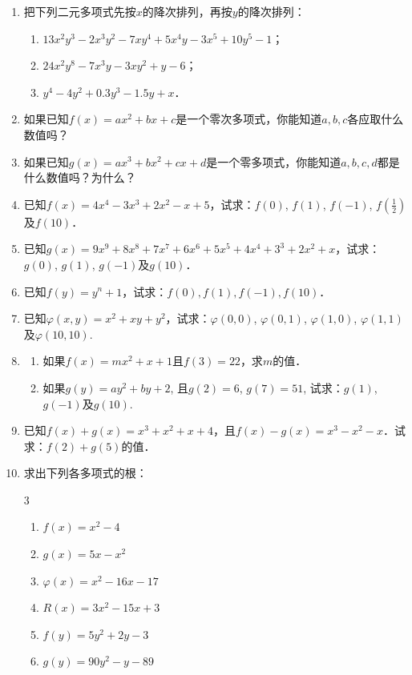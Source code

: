 \begin{enumerate}
\item 把下列二元多项式先按$x$的降次排列，再按$y$的降次排列：
\begin{enumerate}
    \item $13x^2y^3-2x^3y^2-7xy^4+5x^4y-3x^5+10y^5-1$；
    \item $24x^2y^8-7x^3y-3xy^2+y-6$；
    \item $y^4-4y^2+0.3y^3-1.5y+x$．
\end{enumerate}


\item 如果已知$f(x)=ax^2+bx+c$是一个零次多项式，你能知道$a,b,c$各应取什么数值吗？
\item 如果已知$g(x)=ax^3+bx^2+cx+d$是一个零多项式，你能知道$a,b,c,d$都是什么数值吗？为什么？
\item 已知$f(x)=4x^4-3x^3+2x^2-x+5$，试求：$f(0)$, $f(1)$, $f(-1)$, $f\left(\frac{1}{2}\right)$及$f(10)$．
\item 已知$g(x)=9x^9+8x^8+7x^7+6x^6+5x^5+4x^4+3^3+2x^2+x$，试求：$g(0)$, $g(1)$, $g(-1)$及$g(10)$．

\item 已知$f(y)=y^n+1$，试求：$f(0),f(1),f(-1),f(10)$．

\item 已知$\varphi(x,y)=x^2+xy+y^2$，试求：$\varphi(0, 0)$, $\varphi(0, 1)$, $\varphi(1, 0)$, $\varphi(1, 1)$及$\varphi(10, 10)$.
\item \begin{enumerate}
    \item 如果$f(x)=mx^2+x+1$且$f(3)=22$，求$m$的值．
    \item 如果$g(y)=ay^2+by+2$, 且$g(2)=6$, $g (7)=51$, 试求：$g(1)$, $g(-1)$及$g(10)$.
\end{enumerate} 

\item 已知$f(x)+g(x)=x^3+x^2+x+4$，且$f(x)-g(x)=x^3-x^2-x$．试求：$f(2)+g(5)$的值．
\item 求出下列各多项式的根：
    \begin{multicols}{3}
\begin{enumerate}
    \item $f (x) =x^2-4$
    \item $g (x) =5x-x^2$
    \item $\varphi (x) =x^2-16x-17$
    \item $R(x)=3x^2-15x+3$
    \item $f(y)=5y^2+2y-3$
    \item $g(y)=90y^2-y-89$
\end{enumerate}
 \end{multicols}


\end{enumerate}
